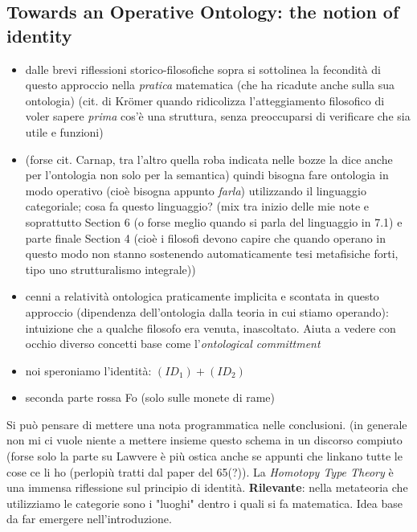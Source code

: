 \documentclass[a4paper, 11pt]{article}
\begin{document}
\subsection{Towards an Operative Ontology: the notion of identity}
\begin{itemize}
	\item dalle brevi riflessioni storico-filosofiche sopra si sottolinea la fecondità di questo approccio nella \emph{pratica} matematica (che ha ricadute anche sulla sua ontologia) (cit. di Kr\"omer quando ridicolizza l'atteggiamento filosofico di voler sapere \emph{prima} cos'è una struttura, senza preoccuparsi di verificare che sia utile e funzioni)
	\item (forse cit. Carnap, tra l'altro quella roba indicata nelle bozze la dice anche per l'ontologia non solo per la semantica) quindi bisogna fare ontologia in modo operativo (cioè bisogna appunto \emph{farla}) utilizzando il linguaggio categoriale; cosa fa questo linguaggio? (mix tra inizio delle mie note e soprattutto Section 6 (o forse meglio quando si parla del linguaggio in 7.1) e parte finale Section 4 (cioè i filosofi devono capire che quando operano in questo modo non stanno sostenendo automaticamente tesi metafisiche forti, tipo uno strutturalismo integrale))
	\item cenni a relatività ontologica praticamente implicita e scontata in questo approccio (dipendenza dell'ontologia dalla teoria in cui stiamo operando): intuizione che a qualche filosofo era venuta, inascoltato. Aiuta a vedere con occhio diverso concetti base come l'\emph{ontological committment} 
	\item noi speroniamo l'identità: $(ID_1) + (ID_2)$
	\item seconda parte rossa Fo (solo sulle monete di rame)
	
\end{itemize}
Si può pensare di mettere una nota programmatica nelle conclusioni. (in generale non mi ci vuole niente a mettere insieme questo schema in un discorso compiuto (forse solo la parte su Lawvere è più ostica anche se appunti che linkano tutte le cose ce li ho (perlopiù tratti dal paper del 65(?)). La \textit{Homotopy Type Theory} è una immensa riflessione sul principio di identità. \textbf{Rilevante}: nella metateoria che utilizziamo le categorie sono i "luoghi" dentro i quali si fa matematica. Idea base da far emergere nell'introduzione. 
\end{document}
